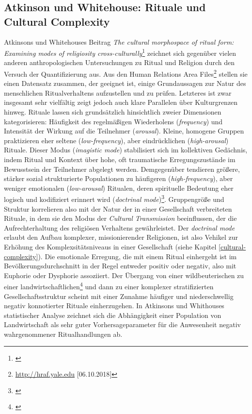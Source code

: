 \documentclass[openany,twoside,twocolumn]{book}
\let\rmarkdownfootnote\footnote%
\def\footnote{\protect\rmarkdownfootnote}
\begin{document}
\hypertarget{atkinson-und-whitehouse-rituale-und-cultural-complexity}{%
\subsection{Atkinson und Whitehouse: Rituale und Cultural
Complexity}\label{atkinson-und-whitehouse-rituale-und-cultural-complexity}}

Atkinsons und Whitehouses Beitrag \emph{The cultural morphospace of
ritual form: Examining modes of religiosity cross-culturally}\footnote{\textcite{atkinson_cultural_2011}}
zeichnet sich gegenüber vielen anderen anthropologischen Untersuchungen
zu Ritual und Religion durch den Versuch der Quantifizierung aus. Aus
den Human Relations Area Files\footnote{\url{http://hraf.yale.edu}
  {[}06.10.2018{]}} stellen sie einen Datensatz zusammen, der geeignet
ist, einige Grundaussagen zur Natur des menschlichen Ritualverhaltens
aufzustellen und zu prüfen. Letzteres ist zwar insgesamt sehr vielfältig
zeigt jedoch auch klare Parallelen über Kulturgrenzen hinweg. Rituale
lassen sich grundsätzlich hinsichtlich zweier Dimensionen
kategorisieren: Häufigkeit des regelmäßigen Wiederholens
(\emph{frequency}) und Intensität der Wirkung auf die Teilnehmer
(\emph{arousal}). Kleine, homogene Gruppen praktizieren eher seltene
(\emph{low-frequency}), aber eindrücklichen (\emph{high-arousal})
Rituale. Dieser Modus (\emph{imagistic mode}) stabilisiert sich im
kollektiven Gedächnis, indem Ritual und Kontext über hohe, oft
traumatische Erregungszustände im Bewusstsein der Teilnehmer abgelegt
werden. Demgegenüber tendieren größere, stärker sozial strukturierte
Populationen zu häufigeren (\emph{high-frequency}), aber weniger
emotionalen (\emph{low-arousal}) Ritualen, deren spirituelle Bedeutung
eher logisch und kodifiziert erinnert wird (\emph{doctrinal
mode})\footnote{\textcite{whitehouse_modes_2004}}. Gruppengröße und
Struktur korrelieren also mit der Natur der in einer Gesellschaft
verbreiteten Rituale, in dem sie den Modus der \emph{Cultural
Transmission} beeinflussen, der die Aufrechterhaltung des religiösen
Verhaltens gewährleistet. Der \emph{doctrinal mode} erlaubt den Aufbau
komplexer, missionierender Religionen, ist also Vehikel zur Erhöhung des
Komplexsitätsniveaus in einer Gesellschaft (siehe Kapitel
\ref{cultural-complexity}). Die emotionale Erregung, die mit einem
Ritual einhergeht ist im Bevölkerungsdurchschnitt in der Regel entweder
positiv oder negativ, also mit Euphorie oder Dysphorie assoziiert. Der
Übergang von einer wildbeuterischen zu einer
landwirtschaftlichen\footnote{\textcite{whitehouse_modes_2010}} und dann
zu einer komplexer stratifizierten Gesellschaftsstruktur scheint mit
einer Zunahme häufiger und niederschwellig negativ konnotierter Rituale
einherzugehen. In Atkinsons und Whithouses statistischer Analyse
zeichnet sich die Abhängigkeit einer Population von Landwirtschaft als
sehr guter Vorhersageparameter für die Anwesenheit negativ
wahrgenommener Ritualhandlungen ab.
\end{document}
